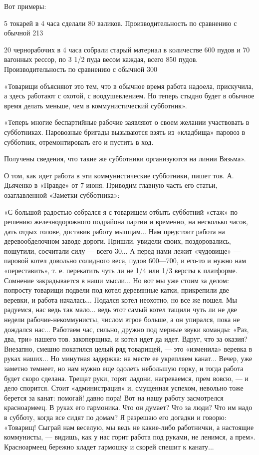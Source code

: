 \documentclass[12pt]{article}
\newcommand{\parnum}{(\arabic{parcount})}
\newcounter{parcount}
\newenvironment{parnumbers}{%
  \par%
  \everypar{\noindent \stepcounter{parcount}\marginpar[]{\parnum}}%
}{}
\begin{document}
\begin{parnumbers}
Вот примеры:

5 токарей в 4 часа сделали 80 валиков. Производительность по сравнению с обычной 213%

20 чернорабочих в 4 часа собрали старый материал в количестве 600 пудов и 70 вагонных рессор, по 3 1/2 пуда весом каждая, всего 850 пудов. Производительность по сравнению с обычной 300%

«Товарищи объясняют это тем, что в обычное время работа надоела, прискучила, а здесь работают с охотой, с воодушевлением. Но теперь стыдно будет в обычное время делать меньше, чем в коммунистический субботник».

«Теперь многие беспартийные рабочие заявляют о своем желании участвовать в субботниках. Паровозные бригады вызываются взять из «кладбища» паровоз в субботник, отремонтировать его и пустить в ход.

Получены сведения, что такие же субботники организуются на линии Вязьма».

О том, как идет работа в эти коммунистические субботники, пишет тов. А. Дьяченко в «Правде» от 7 июня. Приводим главную часть его статьи, озаглавленной «Заметки субботника»:

«С большой радостью собрался я с товарищем отбыть субботний «стаж» по решению железнодорожного подрайона партии и временно, на несколько часов, дать отдых голове, доставив работу мышцам... Нам предстоит работа на деревообделочном заводе дороги. Пришли, увидели своих, поздоровались, пошутили, сосчитали силу — всего 30... А перед нами лежит «чудовище» — паровой котел довольно солидного веса, пудов 600—700, и его-то и нужно нам «переставить», т. е. перекатить чуть ли не 1/4 или 1/3 версты к платформе. Сомнение закрадывается в наши мысли... Но вот мы уже стоим за делом: попросту товарищи подвели под котел деревянные катки, прикрепили две веревки, и работа началась... Подался котел неохотно, но все же пошел. Мы радуемся, нас ведь так мало... ведь этот самый котел тащили чуть ли не две недели рабочие-некоммунисты, числом втрое больше, а он упирался, пока не дождался нас... Работаем час, сильно, дружно под мерные звуки команды: «Раз, два, три» нашего тов. закоперщика, и котел идет да идет. Вдруг, что за оказия? Внезапно, смешно покатился целый ряд товарищей, — это «изменила» веревка в руках наших... Но минутная задержка: на месте ее укрепляем канат... Вечер, уже заметно темнеет, но нам нужно еще одолеть небольшую горку, и тогда работа будет скоро сделана. Трещат руки, горят ладони, нагреваемся, прем вовсю, — и дело спорится. Стоит «администрация» и, смущенная успехом, невольно тоже берется за канат: помогай! давно пора! Вот на нашу работу засмотрелся красноармеец. В руках его гармоника. Что он думает? Что за люди? Что им надо в субботу, когда все сидят по домам? Я разрешаю его догадки и говорю: «Товарищ! Сыграй нам веселую, мы ведь не какие-либо работнички, а настоящие коммунисты, — видишь, как у нас горит работа под руками, не ленимся, а прем». Красноармеец бережно кладет гармошку и скорей спешит к канату...


\end{parnumbers}
\end{document}
